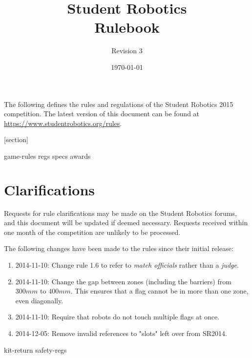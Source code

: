\documentclass[a4paper, 11pt]{scrartcl}
\title {Student Robotics \sryear\\ Rulebook}
\author{Revision 3}
\date{\today}
\newcommand{\sryear}{2015}
\begin{document}
\maketitle

\noindent The following defines the rules and regulations of the Student Robotics \sryear {} competition.  The latest version of this document can be found at \url{https://www.studentrobotics.org/rules}.

[section]
\newcommand{\rcn}{\stepcounter{rule}\arabic{section}.\arabic{rule}}
\renewcommand{\labelenumi}{\rcn}

 {game-rules}
\newpage
 {regs}
\newpage
 {specs}
\newpage
 {awards}

\renewcommand{\labelenumi}{\rcn}

\section{Clarifications}
Requests for rule clarifications may be made on the Student Robotics forums, and this document will be updated if deemed necessary.  Requests received within one month of the competition are unlikely to be processed.

The following changes have been made to the rules since their initial release:

\begin{enumerate}
  \item 2014-11-10: Change rule 1.6 to refer to \emph{match officials} rather than a \emph{judge}.
  \item 2014-11-10: Change the gap between zones (including the barriers) from $300mm$ to $400mm$.
                    This ensures that a flag cannot be in more than one zone, even diagonally.
  \item 2014-11-10: Require that robots do not touch multiple flags at once.
  \item 2014-12-05: Remove invalid references to "slots" left over from SR2014.
\end{enumerate}

\newpage
\appendix
\appendixpage
\addappheadtotoc
 {kit-return}
 {safety-regs}
\end{document}
